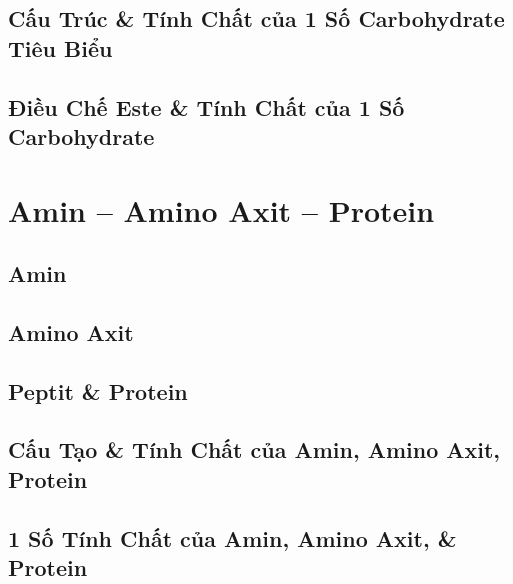 \documentclass{article}
\numberwithin{equation}{section}
\begin{document}

\subsection{Cấu Trúc \& Tính Chất của 1 Số Carbohydrate Tiêu Biểu}


\subsection{Điều Chế Este \& Tính Chất của 1 Số Carbohydrate}


\section{Amin -- Amino Axit -- Protein}

\subsection{Amin}


\subsection{Amino Axit}


\subsection{Peptit \& Protein}


\subsection{Cấu Tạo \& Tính Chất của Amin, Amino Axit, Protein}


\subsection{1 Số Tính Chất của Amin, Amino Axit, \& Protein}
\end{document}

